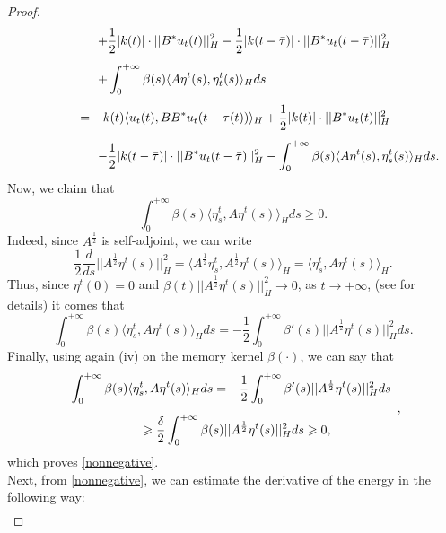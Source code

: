 \documentclass[11pt]{article}
\renewcommand{\geq}{\geqslant}
\renewcommand{\ge}{\geqslant}
\begin{document}
\begin{proof}
$$\begin{array}{l}
		\vspace{0.3cm}\displaystyle{\hspace{2cm}+\frac{1}{2} |k(t)|\cdot ||B^*u_t(t)||_H^2-\frac{1}{2}|k(t-\bar{\tau})|\cdot ||B^*u_t(t-\bar\tau)||_H^2}\\
		\vspace{0.3cm}\displaystyle{\hspace{2cm}+\int_0^{+\infty} \beta (s) \langle A\eta^t(s),\eta^t_t(s) \rangle_H ds}\\
		\vspace{0.3cm}\displaystyle{\hspace{1.5cm}=-k(t)\langle u_t(t),BB^*u_t(t-\tau(t))\rangle_H+\frac{1}{2} |k(t)|\cdot ||B^*u_t(t)||_H^2}\\
		\displaystyle{\hspace{2cm}-\frac{1}{2}|k(t-\bar{\tau})|\cdot ||B^*u_t(t-\bar\tau)||_H^2-\int_0^{+\infty} \beta (s) \langle A\eta^t(s),\eta^t_s(s) \rangle_H ds.}
	\end{array}
	$$
	Now, we claim that
	\begin{equation}\label{nonnegative}
		\int_0^{+\infty} \beta(s) \langle \eta ^t_s, A\eta^t(s) \rangle_H ds \ge 0.
	\end{equation}
	Indeed, since $A^{\frac{1}{2}}$ is self-adjoint, we can write
	$$\frac{1}{2}\frac{d}{ds}||A^{\frac{1}{2}} \eta^t(s)||_H^2=\langle A^{\frac{1}{2}}\eta ^t_s, A^{\frac{1}{2}}\eta^t(s) \rangle_H=\langle \eta ^t_s, A\eta^t(s) \rangle_H.$$
	Thus, since $\eta^t(0)=0$ and $\beta(t)||A^{\frac{1}{2}} \eta^t(s)||_H^2\to 0$, as $t\to +\infty$, (see \cite{Pata} for details) it comes that
	$$
	\int_0^{+\infty} \beta(s) \langle \eta ^t_s, A\eta^t(s) \rangle_H ds = -\frac{1}{2}\int_0^{+\infty} \beta'(s) ||A^{\frac{1}{2}} \eta^t(s)||_H^2 ds.$$
	Finally, using again (iv) on the memory kernel $\beta(\cdot)$, we can say that
	$$
	\begin{array}{l}
		\vspace{0.3cm}\displaystyle{\int_0^{+\infty} \beta(s) \langle \eta ^t_s, A\eta^t(s) \rangle_H ds = -\frac{1}{2}\int_0^{+\infty} \beta'(s) ||A^{\frac{1}{2}} \eta^t(s)||_H^2 ds}\\
		\displaystyle{\hspace{2cm}\geq \frac{\delta}{2} \int_0^{+\infty} \beta(s) ||A^{\frac{1}{2}} \eta^t(s)||_H^2 ds\geq 0,}
	\end{array},$$
	which proves \eqref{nonnegative}.
	\\Next, from \eqref{nonnegative}, we can estimate the derivative of the energy in the following way:
	$$
	\begin{array}{l}

\end{array}$$
\end{proof}
\end{document}
